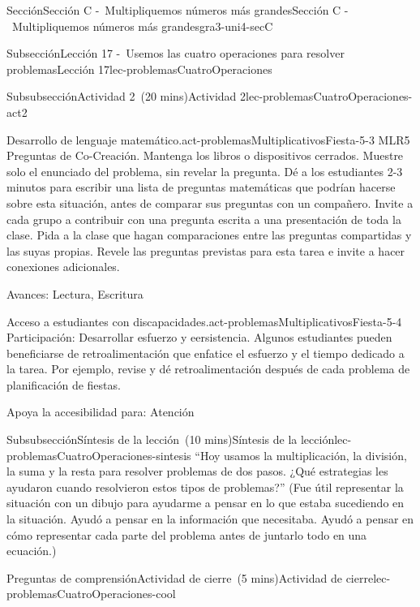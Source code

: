 \documentclass[oneside,10pt,]{article}
\begin{document}
\begin{sectionptx}{Sección}{Sección C -~Multipliquemos números más grandes}{}{Sección C -~Multipliquemos números más grandes}{}{}{gra3-uni4-secC}
\begin{subsectionptx}{Subsección}{Lección 17 -~Usemos las cuatro operaciones para resolver problemas}{}{Lección 17}{}{}{lec-problemasCuatroOperaciones}
\begin{subsubsectionptx}{Subsubsección}{Actividad 2~(20 mins)}{}{Actividad 2}{}{}{lec-problemasCuatroOperaciones-act2}
\begin{paragraphs}{Desarrollo de lenguaje matemático.}{act-problemasMultiplicativosFiesta-5-3}
MLR5 Preguntas de Co-Creación. Mantenga los libros o dispositivos cerrados. Muestre solo el enunciado del problema, sin revelar la pregunta. Dé a los estudiantes 2-3 minutos para escribir una lista de preguntas matemáticas que podrían hacerse sobre esta situación, antes de comparar sus preguntas con un compañero. Invite a cada grupo a contribuir con una pregunta escrita a una presentación de toda la clase. Pida a la clase que hagan comparaciones entre las preguntas compartidas y las suyas propias. Revele las preguntas previstas para esta tarea e invite a hacer conexiones adicionales.%
\par
Avances: Lectura, Escritura%
\end{paragraphs}%
\begin{paragraphs}{Acceso a estudiantes con discapacidades.}{act-problemasMultiplicativosFiesta-5-4}%
Participación: Desarrollar esfuerzo y eersistencia. Algunos estudiantes pueden beneficiarse de retroalimentación que enfatice el esfuerzo y el tiempo dedicado a la tarea. Por ejemplo, revise y dé retroalimentación después de cada problema de planificación de fiestas.%
\par
Apoya la accesibilidad para: Atención%
\end{paragraphs}%
\end{subsubsectionptx}
%
%
\typeout{************************************************}
\typeout{************************************************}
%
\begin{subsubsectionptx}{Subsubsección}{Síntesis de la lección~(10 mins)}{}{Síntesis de la lección}{}{}{lec-problemasCuatroOperaciones-sintesis}
``Hoy usamos la multiplicación, la división, la suma y la resta para resolver problemas de dos pasos. ¿Qué estrategias les ayudaron cuando resolvieron estos tipos de problemas?'' (Fue útil representar la situación con un dibujo para ayudarme a pensar en lo que estaba sucediendo en la situación. Ayudó a pensar en la información que necesitaba. Ayudó a pensar en cómo representar cada parte del problema antes de juntarlo todo en una ecuación.)%
\end{subsubsectionptx}
%
%
\typeout{************************************************}
\typeout{************************************************}
%
\begin{reading-questions-subsubsection}{Preguntas de comprensión}{Actividad de cierre~(5 mins)}{}{Actividad de cierre}{}{}{lec-problemasCuatroOperaciones-cool}

\end{reading-questions-subsubsection}
\end{subsectionptx}
\end{sectionptx}
\end{document}
